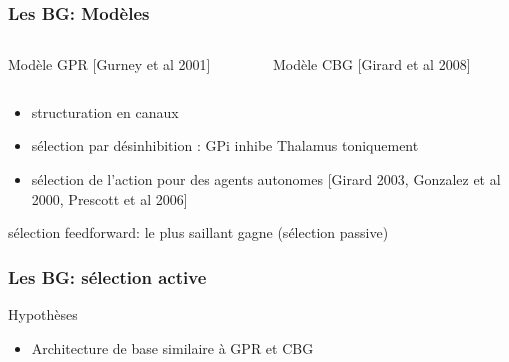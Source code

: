 \documentclass[10pt]{beamer}
\begin{document}
\begin{frame}
  \frametitle{Les BG: Mod\`eles}
\begin{columns}

	    \begin{column}{0.5\textwidth}
         {\color {blue}Mod\`ele GPR} [Gurney et al 2001]

	    \end{column}


\begin{column}{0.5\textwidth}  
{\color {blue}Mod\`ele CBG} [Girard et al 2008] 
\hspace{0.3cm}
\end{column}

\end{columns}
\begin{itemize}
\item structuration en {\color {blue}canaux}
\item s\'election par {\color {blue}d\'esinhibition} : GPi inhibe Thalamus toniquement
\item s\'election de l'action pour des agents autonomes [Girard 2003, Gonzalez et al 2000, Prescott et al 2006]
\end{itemize}
\hspace{0.5cm}{ {\color {blue} $\to$}} { {\color {purple} s\'election feedforward: le plus saillant gagne}} (s\'election passive)
\end{frame}

\begin{frame}
  \frametitle{Les BG: s\'election active}
{{\color {blue} Hypoth\`eses}}
\begin{itemize}
\item Architecture de base similaire \`a GPR et CBG%
\end{itemize}
\hspace{2cm}     

\end{frame}
\end{document}
